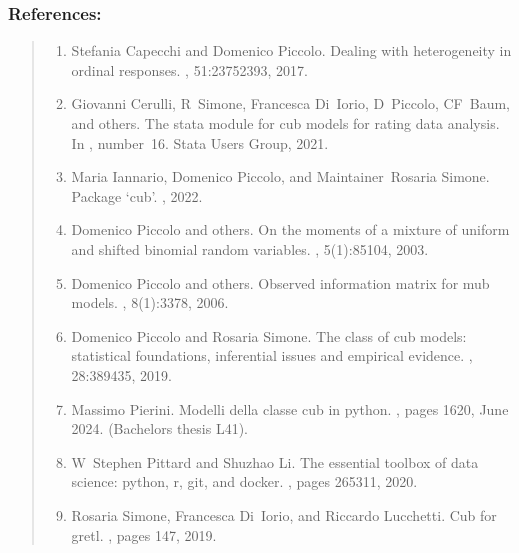 \documentclass[letterpaper,10pt,english]{sphinxmanual}
\begin{document}
\subsubsection{References:}
\label{\detokenize{cubmods:id117}}\begin{quote}
\begin{enumerate}
%
\setcounter{enumi}{0}
\item {} 
\sphinxAtStartPar
Stefania Capecchi and Domenico Piccolo. Dealing with heterogeneity in ordinal responses. , 51:2375\textendash{}2393, 2017.

\item {} 
\sphinxAtStartPar
Giovanni Cerulli, R Simone, Francesca Di Iorio, D Piccolo, CF Baum, and others. The stata module for cub models for rating data analysis. In , number 16. Stata Users Group, 2021.

\item {} 
\sphinxAtStartPar
Maria Iannario, Domenico Piccolo, and Maintainer Rosaria Simone. Package ‘cub’. , 2022.

\item {} 
\sphinxAtStartPar
Domenico Piccolo and others. On the moments of a mixture of uniform and shifted binomial random variables. , 5(1):85\textendash{}104, 2003.

\item {} 
\sphinxAtStartPar
Domenico Piccolo and others. Observed information matrix for mub models. , 8(1):33\textendash{}78, 2006.

\item {} 
\sphinxAtStartPar
Domenico Piccolo and Rosaria Simone. The class of cub models: statistical foundations, inferential issues and empirical evidence. , 28:389\textendash{}435, 2019.

\item {} 
\sphinxAtStartPar
Massimo Pierini. Modelli della classe cub in python. , pages 16\textendash{}20, June 2024. (Bachelor\textquotesingle{}s thesis L\sphinxhyphen{}41).

\item {} 
\sphinxAtStartPar
W Stephen Pittard and Shuzhao Li. The essential toolbox of data science: python, r, git, and docker. , pages 265\textendash{}311, 2020.

\item {} 
\sphinxAtStartPar
Rosaria Simone, Francesca Di Iorio, and Riccardo Lucchetti. Cub for gretl. , pages 147, 2019.

\end{enumerate}
\end{quote}
\end{document}
